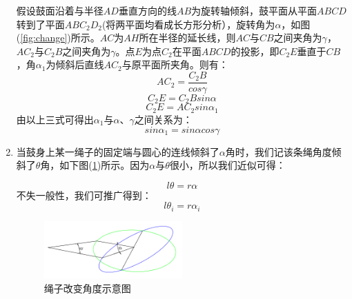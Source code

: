 \documentclass{cumcm}
\begin{document}
\begin{enumerate}
\quad \quad
假设鼓面沿着与半径$AD$垂直方向的线$AB$为旋转轴倾斜，鼓平面从平面$ABCD$转到了平面$ABC_2D_2$(将两平面均看成长方形分析），旋转角为$\alpha$，如图(\ref{fig:change})所示。$AC$为$AH$所在半径的延长线，则$AC$与$CB$之间夹角为$\gamma$，$AC_2$与$C_2B$之间夹角为$\gamma$。点$E$为点$C_2$在平面$ABCD$的投影，即$C_2E$垂直于$CB$，角$\alpha_1$为倾斜后直线$AC_2$与原平面所夹角。则有：\\
\begin{displaymath}
AC_2=\frac{C_2B}{cos\gamma}
\end{displaymath}
\begin{displaymath}
C_2E=C_2Bsin\alpha
\end{displaymath}
\begin{displaymath}
C_2E=AC_2sin\alpha_1
\end{displaymath}
由以上三式可得出$\alpha_1$与$\alpha$、$\gamma$之间关系为：
\begin{equation}
sin\alpha_1=sin\alpha cos\gamma
\end{equation}

\item 当鼓身上某一绳子的固定端与圆心的连线倾斜了$\alpha$角时，我们记该条绳角度倾斜了$\theta$角，如下图(\ref{fig:angel})所示。因为$\alpha$与$\theta$很小，所以我们近似可得：

\begin{displaymath}
l\theta=r\alpha
\end{displaymath}
不失一般性，我们可推广得到：
\begin{equation}
l\theta_i=r\alpha_i
\end{equation}
\begin{figure}[H]
\centering
\includegraphics[width=0.5\textwidth]{img/angel.png}
\caption{绳子改变角度示意图}\label{fig:angel}
\end{figure}


\end{enumerate}
\end{document}
